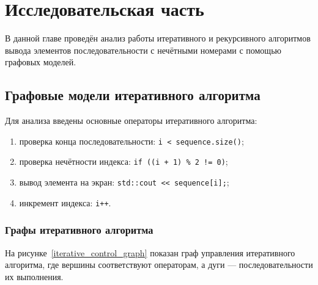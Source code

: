 \chapter{Исследовательская часть}

В данной главе проведён анализ работы итеративного и рекурсивного алгоритмов вывода элементов последовательности с нечётными номерами с помощью графовых моделей.

\section{Графовые модели итеративного алгоритма}

Для анализа введены основные операторы итеративного алгоритма:
\begin{enumerate}
	\item проверка конца последовательности: \texttt{i < sequence.size()};
	\item проверка нечётности индекса: \texttt{if ((i + 1) \% 2 != 0)};
	\item вывод элемента на экран: \texttt{std::cout << sequence[i];};
	\item инкремент индекса: \texttt{i++}.
\end{enumerate}

\subsection{Графы итеративного алгоритма}

На рисунке~\ref{iterative_control_graph} показан граф управления итеративного алгоритма, где вершины соответствуют операторам, а дуги --- последовательности их выполнения.

